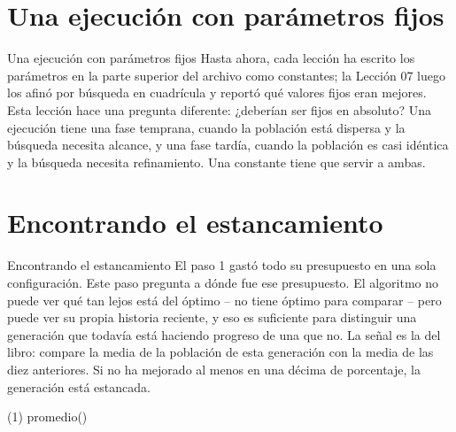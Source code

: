 \section{Una ejecución con parámetros fijos}

\begin{frame}{Una ejecución con parámetros fijos}
Hasta ahora, cada lección ha escrito los parámetros en la parte superior del archivo como
constantes; la Lección 07 luego los afinó por búsqueda en cuadrícula y reportó qué valores fijos
eran mejores. Esta lección hace una pregunta diferente: ¿deberían ser fijos
en absoluto? Una ejecución tiene una fase temprana, cuando la población está dispersa y la
búsqueda necesita alcance, y una fase tardía, cuando la población es casi idéntica
y la búsqueda necesita refinamiento. Una constante tiene que servir a ambas.
\end{frame}


\section{Encontrando el estancamiento}

\begin{frame}{Encontrando el estancamiento}
El paso 1 gastó todo su presupuesto en una sola configuración. Este paso pregunta a dónde fue ese presupuesto.
El algoritmo no puede ver qué tan lejos está del óptimo -- no tiene óptimo para comparar -- pero puede
ver su propia historia reciente, y eso es suficiente para distinguir una generación que todavía está haciendo
progreso de una que no. La señal es la del libro: compare la media de la población de esta generación
con la media de las diez anteriores. Si no ha mejorado al menos en una décima de porcentaje, la generación está estancada.
\end{frame}

\begin{frame}[fragile]{(1) promedio()}

\end{frame}

